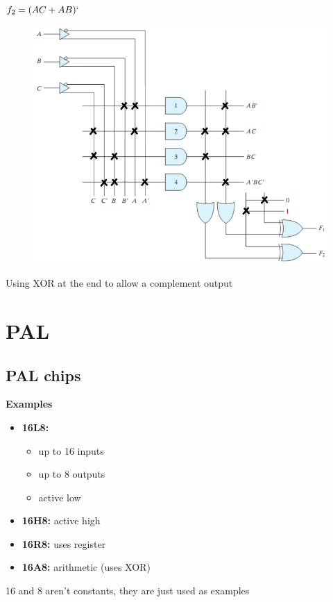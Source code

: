 \documentclass[12 pt]{article}
\begin{document}
$f_2=(AC+AB)`$
\begin{figure}[H]
    \centering
    \includegraphics[scale=0.3]{./images/micro1}
    \label{micro1} 
\end{figure}
Using XOR at the end to allow a complement output
\section{PAL}
\subsection{PAL chips}
\begin{minipage}{8cm}
\textbf{Examples}
\begin{itemize}
    \item \textbf{16L8:} \begin{itemize}
        \item up to 16 inputs
        \item up to 8 outputs
        \item active low
    \end{itemize}
    \item \textbf{16H8:} active high
    \item \textbf{16R8:} uses register
    \item \textbf{16A8:} arithmetic (uses XOR)
\end{itemize}
\end{minipage}
\hfill
\begin{minipage}{10cm}
\begin{YStkyNote}[Note 1]
    16 and 8 aren't constants, they are just used as examples
\end{YStkyNote}
\end{minipage}
\end{document}
